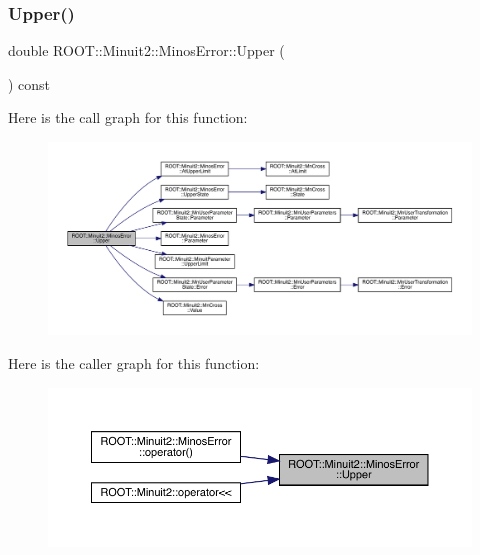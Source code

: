 \subsubsection{\texorpdfstring{Upper()}{Upper()}\hspace{0.1cm}{\footnotesize\ttfamily [3/3]}}
{\footnotesize\ttfamily double R\+O\+O\+T\+::\+Minuit2\+::\+Minos\+Error\+::\+Upper (\begin{DoxyParamCaption}{ }\end{DoxyParamCaption}) const\hspace{0.3cm}{\ttfamily [inline]}}

Here is the call graph for this function\+:
\nopagebreak
\begin{figure}[H]
\begin{center}
\leavevmode
\includegraphics[width=350pt]{d2/dd1/classROOT_1_1Minuit2_1_1MinosError_a0223fde13608aadee1f15b51d15b2bf6_cgraph}
\end{center}
\end{figure}
Here is the caller graph for this function\+:
\nopagebreak
\begin{figure}[H]
\begin{center}
\leavevmode
\includegraphics[width=350pt]{d2/dd1/classROOT_1_1Minuit2_1_1MinosError_a0223fde13608aadee1f15b51d15b2bf6_icgraph}
\end{center}
\end{figure}
\mbox{\label{classROOT_1_1Minuit2_1_1MinosError_a5f37bb106903e148029b8461f9bbbe25}} 
